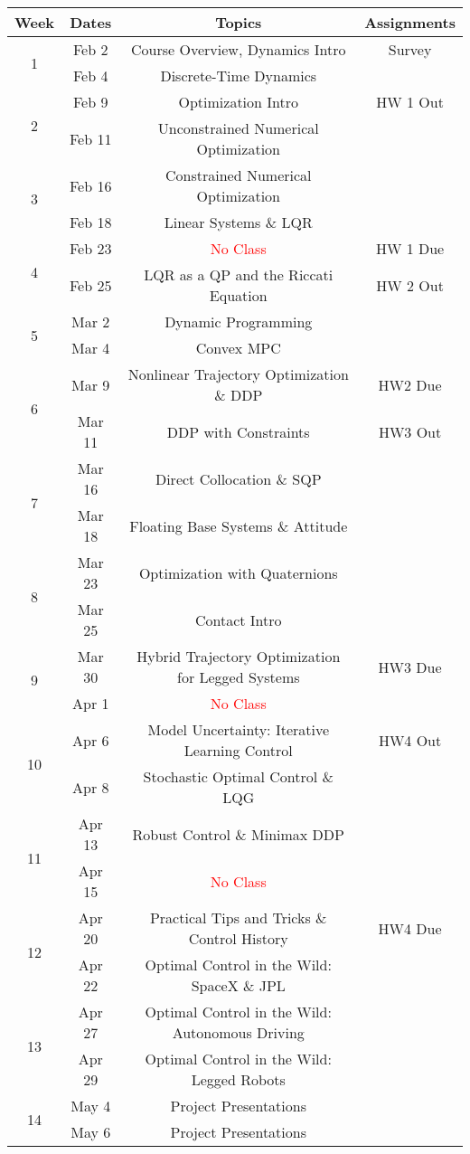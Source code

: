 \documentclass[11pt,letterpaper]{article}
\begin{document}
\begin{tabular}{c|c|c|c}
	Week & Dates & Topics & Assignments \\
	\hline
	\multirow{2}{*}{1} & Feb 2 & Course Overview, Dynamics Intro & Survey \\
	 & Feb 4 & Discrete-Time Dynamics &  \\
	\hline
	\multirow{2}{*}{2} & Feb 9 & Optimization Intro & HW 1 Out \\
	 & Feb 11 & Unconstrained Numerical Optimization &  \\
	\hline
	\multirow{2}{*}{3}  & Feb 16 & Constrained Numerical Optimization &  \\
	 & Feb 18 & Linear Systems \& LQR &  \\
	\hline
	\multirow{2}{*}{4}  & Feb 23 & \textcolor{red}{No Class} & HW 1 Due \\
	 & Feb 25 & LQR as a QP and the Riccati Equation & HW 2 Out \\
	\hline
	\multirow{2}{*}{5}  & Mar 2 & Dynamic Programming & \\
	 & Mar 4 & Convex MPC &  \\
	\hline
	\multirow{2}{*}{6}  & Mar 9 & Nonlinear Trajectory Optimization \& DDP &   HW2 Due \\
	 & Mar 11 & DDP with Constraints & HW3 Out \\
	\hline
	\multirow{2}{*}{7}  & Mar 16 & Direct Collocation \& SQP  & \\
	 & Mar 18 & Floating Base Systems \& Attitude & \\
	\hline
	\multirow{2}{*}{8}  & Mar 23 & Optimization with Quaternions & \\
	 & Mar 25 & Contact Intro & \\
	\hline
	\multirow{2}{*}{9}  & Mar 30 & Hybrid Trajectory Optimization for Legged Systems & HW3 Due \\
	 & Apr 1 & \textcolor{red}{No Class} &   \\
	\hline
	\multirow{2}{*}{10}  & Apr 6 & Model Uncertainty: Iterative Learning Control &  HW4 Out \\
	 & Apr 8 & Stochastic Optimal Control \& LQG & \\
	 \hline
	\multirow{2}{*}{11}  & Apr 13 & Robust Control \& Minimax DDP &  \\
	 & Apr 15 & \textcolor{red}{No Class} &   \\
	 \hline
	\multirow{2}{*}{12}  & Apr 20 & Practical Tips and Tricks \& Control History &  HW4 Due \\
	 & Apr 22 & Optimal Control in the Wild: SpaceX \& JPL &   \\
	 \hline
	\multirow{2}{*}{13}  & Apr 27 & Optimal Control in the Wild: Autonomous Driving &  \\
	 & Apr 29 & Optimal Control in the Wild: Legged Robots &   \\
	 \hline
	\multirow{2}{*}{14}  & May 4 & Project Presentations &  \\
	 & May 6 & Project Presentations &   \\
\end{tabular}
\end{document}

